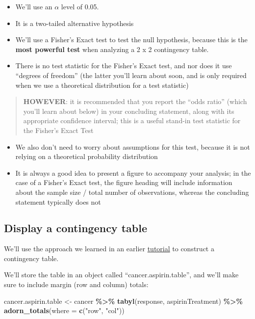 \documentclass[
]{book}
\newenvironment{Shaded}{\begin{snugshade}}{\end{snugshade}}
\newcommand{\AttributeTok}[1]{\textcolor[rgb]{0.13,0.29,0.53}{#1}}
\newcommand{\FunctionTok}[1]{\textcolor[rgb]{0.13,0.29,0.53}{\textbf{#1}}}
\newcommand{\NormalTok}[1]{#1}
\newcommand{\OtherTok}[1]{\textcolor[rgb]{0.56,0.35,0.01}{#1}}
\newcommand{\SpecialCharTok}[1]{\textcolor[rgb]{0.81,0.36,0.00}{\textbf{#1}}}
\newcommand{\StringTok}[1]{\textcolor[rgb]{0.31,0.60,0.02}{#1}}
\providecommand{\tightlist}{%
  \setlength{\itemsep}{0pt}\setlength{\parskip}{0pt}}
\begin{document}
\begin{itemize}
\tightlist
\item
  We'll use an \(\alpha\) level of 0.05.\\
\item
  It is a two-tailed alternative hypothesis
\item
  We'll use a Fisher's Exact test to test the null hypothesis, because this is the \textbf{most powerful test} when analyzing a 2 x 2 contingency table.\\
\item
  There is no test statistic for the Fisher's Exact test, and nor does it use ``degrees of freedom'' (the latter you'll learn about soon, and is only required when we use a theoretical distribution for a test statistic)
\end{itemize}

\begin{quote}
\textbf{HOWEVER}: it is recommended that you report the ``odds ratio'' (which you'll learn about below) in your concluding statement, along with its appropriate confidence interval; this is a useful stand-in test statistic for the Fisher's Exact Test
\end{quote}

\begin{itemize}
\tightlist
\item
  We also don't need to worry about assumptions for this test, because it is not relying on a theoretical probability distribution\\
\item
  It is always a good idea to present a figure to accompany your analysis; in the case of a Fisher's Exact test, the figure heading will include information about the sample size / total number of observations, whereas the concluding statement typically does not
\end{itemize}

\subsection{Display a contingency table}\label{show_cont_table}

We'll use the approach we learned in an earlier \hyperref[vis2_cont_table]{tutorial} to construct a contingency table.

We'll store the table in an object called ``cancer.aspirin.table'', and we'll make sure to include margin (row and column) totals:

\begin{Shaded}
\begin{Highlighting}[]
\NormalTok{cancer.aspirin.table }\OtherTok{\textless{}{-}}\NormalTok{ cancer }\SpecialCharTok{\%\textgreater{}\%}
  \FunctionTok{tabyl}\NormalTok{(response, aspirinTreatment) }\SpecialCharTok{\%\textgreater{}\%}
  \FunctionTok{adorn\_totals}\NormalTok{(}\AttributeTok{where =} \FunctionTok{c}\NormalTok{(}\StringTok{"row"}\NormalTok{, }\StringTok{"col"}\NormalTok{))}
\end{Highlighting}
\end{Shaded}
\end{document}
